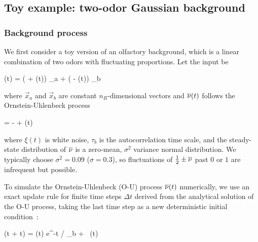 \subsection{Toy example: two-odor Gaussian background}
\label{subsect:2d_model}


\subsubsection{Background process}
\label{subsubsect:2d_background}
We first consider a toy version of an olfactory background, which is a linear combination of two odors with fluctuating proportions. Let the input be

\beq
	(t) = \left( + \ovl{\nu}(t)\right) _a + \left( - \ovl{\nu}(t)\right) _b
	\label{eq:2d_mixture_process}
\eeq

where $\vec{x}_a$ and $\vec{x}_b$ are constant $n_R$-dimensional vectors and $\overline{\nu}(t)$ follows the Ornstein-Uhlenbeck process

\beq
	 = - \ovl{\nu} +  \xi(t)
	\label{eq:oh_process_1d}
\eeq

where $\xi(t)$ is white noise, $\tau_b$ is the autocorrelation time scale, and the steady-state distribution of $\overline{\nu}$ is a zero-mean, $\sigma^2$ variance normal distribution. We typically choose $\sigma^2 = 0.09$ ($\sigma = 0.3$), so fluctuations of $\frac12 \pm \overline{\nu}$ past $0$ or $1$ are infrequent but possible. 

To simulate the Ornstein-Uhlenbeck (O-U) process $\overline{\nu}(t)$ numerically, we use an exact update rule for finite time steps $\Delta t$ derived from the analytical solution of the O-U process, taking the last time step as a new deterministic initial condition~\cite[eq.~2.47]{gillespie_mathematics_1996}:

\beq
	\ovl{\nu}(t + \Delta t) = \ovl{\nu}(t) e^{-\Delta t / \tau_b} + \, \xi(t)
	\label{eq:exact_update_rule_o-u}
\eeq

